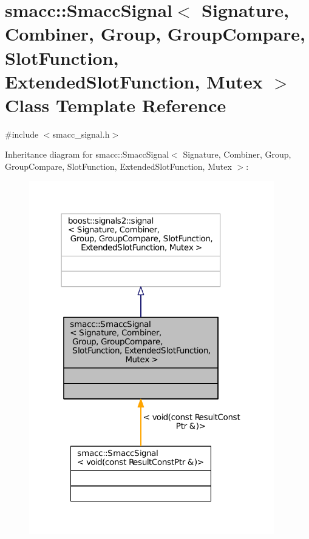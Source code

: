 \hypertarget{classsmacc_1_1SmaccSignal}{}\section{smacc\+:\+:Smacc\+Signal$<$ Signature, Combiner, Group, Group\+Compare, Slot\+Function, Extended\+Slot\+Function, Mutex $>$ Class Template Reference}
\label{classsmacc_1_1SmaccSignal}


{\ttfamily \#include $<$smacc\+\_\+signal.\+h$>$}



Inheritance diagram for smacc\+:\+:Smacc\+Signal$<$ Signature, Combiner, Group, Group\+Compare, Slot\+Function, Extended\+Slot\+Function, Mutex $>$\+:
\nopagebreak
\begin{figure}[H]
\begin{center}
\leavevmode
\includegraphics[width=302pt]{classsmacc_1_1SmaccSignal__inherit__graph}
\end{center}
\end{figure}


